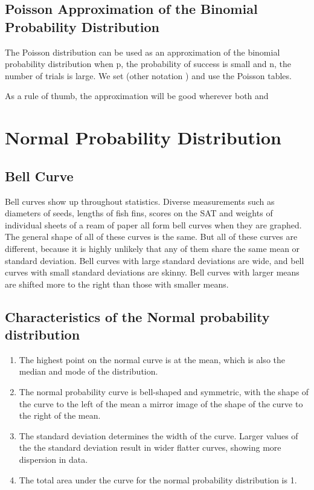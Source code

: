 \subsection{Poisson Approximation of the Binomial Probability Distribution}

The Poisson distribution can be used  as an approximation of the binomial probability distribution when p, the probability of success is small and n, the number of trials is large.
We set   (other notation  )  and use the Poisson tables. 
 
As a rule of thumb, the approximation will be good wherever both  and  
 

\newpage
\section{Normal Probability Distribution}

\subsection{Bell Curve}
Bell curves show up throughout statistics. Diverse measurements such as diameters of seeds, lengths of fish fins, scores on the SAT and weights of individual sheets of a ream of paper all form bell curves when they are graphed. The general shape of all of these curves is the same. But all of these curves are different, because it is highly unlikely that any of them share the same mean or standard deviation. Bell curves with large standard deviations are wide, and bell curves with small standard deviations are skinny. Bell curves with larger means are shifted more to the right than those with smaller means.

\subsection*{Characteristics of the Normal probability distribution}

\begin{enumerate}
\item The highest point on the normal curve is at the mean, which is also the median and mode of the distribution.

\item The normal probability curve is bell-shaped and symmetric, with the shape of the curve to the left of the mean a mirror image of the shape of the curve to the right of the mean.

\item The standard deviation determines the width of the curve. Larger values of the the standard deviation result in wider flatter curves, showing more dispersion in data.

\item The total area under the curve for the normal probability distribution is 1.
\end{enumerate}

